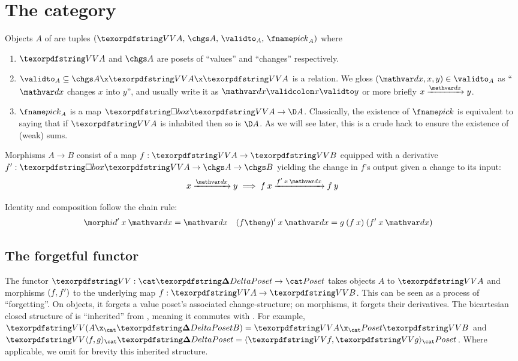\section{The category \CP}
\label{sec:changeposet}

Objects $A$ of \CP{} are tuples $\tuple{\vals A,\, \chgs A,\, {\validto_A},\,
  \dummy_A}$ where
%
\begin{enumerate}
\item $\vals A$ and $\chgs A$ are posets of ``values'' and ``changes'' respectively.

\item ${\validto_A} \subseteq \chgs A \x \vals A \x \vals A$ is a relation. We
  gloss $(\dx,x,y) \in {\validto_A}$ as ``$\dx$ changes $x$ into $y$'', and
  usually write it as $\valid \dx x y$ or more briefly $\vld \dx x y$.

\item $\dummy_A$ is a map $\iso \vals A \to \D A$. Classically, the existence of
  $\dummy$ is equivalent to saying that if $\vals A$ is inhabited then so is $\D
  A$. As we will see later, this is a crude hack to ensure the existence of
  (weak) sums.
\end{enumerate}

\noindent
Morphisms $A \to B$ consist of a map $f : \vals A \to \vals B$ equipped with a
derivative $\deriv f : \iso \vals A \to \chgs A \to \chgs B$ yielding the change
in $f$'s output given a change to its input:
%
\begin{equation}\label{eqn:deriv}
    \vld \dx x y \implies \vld {\deriv f \<x\<\dx} {f\<x}{f\<y}
\end{equation}

\noindent
Identity and composition follow the chain rule:
%
\begin{align*}
  \deriv \id \<x \<\dx &= \dx &
  \deriv{(f \then g)} \<x \<\dx &= g \<(f\<x) \<(\deriv f \<x \<\dx)
\end{align*}


\subsection{\boldmath The forgetful functor \valfn}

The functor $\valfn : \CP \to \Poset$ takes objects $A$ to $\vals A$ and
morphisms $(f,f')$ to the underlying map $f : \vals A \to \vals B$. This
can be seen as a process of ``forgetting''. On objects, it forgets a value
poset's associated change-structure; on morphisms, it forgets their derivatives.
%
The bicartesian closed structure of \CP{} is ``inherited'' from \Poset, meaning
it commutes with \valfn. For example, $\vals{(A \x_\CP B)} = \vals A \x_\Poset
\vals B$ and $\vals{\fork{f,g}_\CP} = \fork{\vals f, \vals g}_\Poset$.
%
Where applicable, we omit for brevity this inherited structure.

